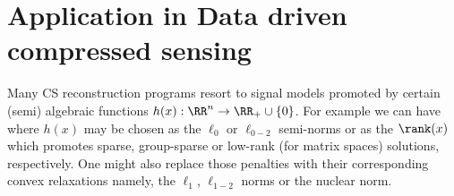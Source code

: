 \section{Application in Data driven compressed sensing}
\label{sec:datadrivenCS}
Many CS reconstruction programs resort to signal models promoted by certain (semi) algebraic functions $h(x):\RR^n\rightarrow \RR_+\cup\{ 0\}$. For example we can have
where $h(x)$ may be chosen as the $\ell_{0}$ or $\ell_{0-2}$ semi-norms or as the $\rank(x)$  which promotes sparse, group-sparse or low-rank (for matrix spaces) solutions, respectively. One might also replace those penalties with their corresponding  %
convex relaxations namely, the $\ell_1$, $\ell_{1-2}$ norms or the nuclear norm. 

